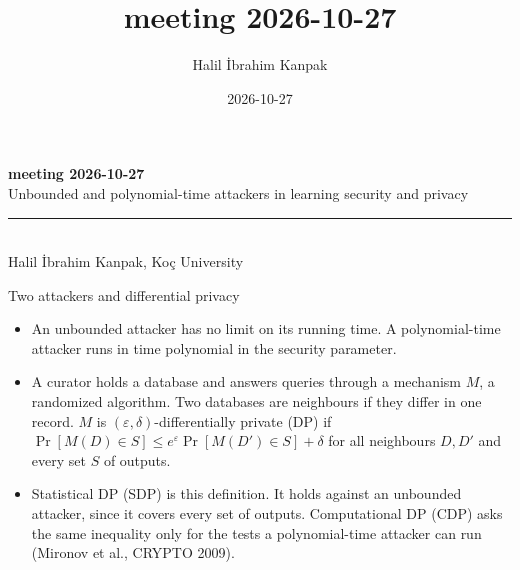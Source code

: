 \documentclass[aspectratio=169,10pt]{beamer}
\title{meeting 2026-10-27}
\author{Halil \.{I}brahim Kanpak}
\date{2026-10-27}
\newcommand{\redline}{\textcolor{kred}{\rule{\textwidth}{1pt}}}
\begin{document}
\begin{frame}[plain]
  \vfill
  {\Huge\textbf{\textcolor{kred}{meeting 2026-10-27}}}\\[0.4em]
  {\large Unbounded and polynomial-time attackers in learning security and privacy}\\[1.2em]
  \redline\\[0.8em]
  {\small Halil \.{I}brahim Kanpak, Ko\c{c} University}
  \vfill
\end{frame}

\begin{frame}{Two attackers and differential privacy}
  \begin{itemize}
    \item An unbounded attacker has no limit on its running time. A polynomial-time attacker runs in time polynomial in the security parameter.
    \item A curator holds a database and answers queries through a mechanism $M$, a randomized algorithm. Two databases are neighbours if they differ in one record. $M$ is $(\varepsilon,\delta)$-differentially private (DP) if $\Pr[M(D)\in S]\le e^{\varepsilon}\Pr[M(D')\in S]+\delta$ for all neighbours $D,D'$ and every set $S$ of outputs.
    \item Statistical DP (SDP) is this definition. It holds against an unbounded attacker, since it covers every set of outputs. Computational DP (CDP) asks the same inequality only for the tests a polynomial-time attacker can run (Mironov et al., CRYPTO 2009).
  \end{itemize}
\end{frame}
\end{document}
